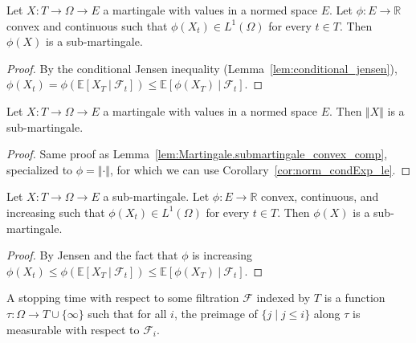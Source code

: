 \begin{lemma}\label{lem:Martingale.submartingale_convex_comp}
Let $X : T \rightarrow \Omega\rightarrow E$ a martingale with values in a normed space $E$.
Let $\phi : E \rightarrow \mathbb{R}$ convex and continuous such that
$\phi(X_t)\in L^1(\Omega)$ for every $t\in T$. Then $\phi(X)$ is a sub-martingale.
\end{lemma}

\begin{proof}
  By the conditional Jensen inequality (Lemma~\ref{lem:conditional_jensen}),
  $\phi(X_t) = \phi\left( \mathbb{E}[X_T\ |\ \mathcal{F}_t] \right)\leq \mathbb{E}[\phi(X_T)\ |\ \mathcal{F}_t]$.
\end{proof}


\begin{corollary}\label{cor:Martingale.submartingale_norm}
  Let $X : T \rightarrow \Omega \rightarrow E$ a martingale with values in a normed space $E$.
  Then $\Vert X \Vert$ is a sub-martingale.
\end{corollary}

\begin{proof}
Same proof as Lemma~\ref{lem:Martingale.submartingale_convex_comp}, specialized to $\phi = \Vert \cdot \Vert$, for which we can use Corollary~\ref{cor:norm_condExp_le}.
\end{proof}


\begin{lemma}\label{lem:convex_of_submg_is_submg}
Let $X : T  \rightarrow \Omega \rightarrow E$ a sub-martingale.
Let $\phi:E \rightarrow \mathbb{R}$ convex, continuous, and increasing such that
$\phi(X_t)\in L^1(\Omega)$ for every $t\in T$. Then $\phi(X)$ is a sub-martingale.
\end{lemma}

\begin{proof}
  By Jensen and the fact that $\phi$ is increasing
  $\phi(X_t) \leq \phi\left( \mathbb{E}[X_T\ |\ \mathcal{F}_t] \right)\leq \mathbb{E}[\phi(X_T)\ |\ \mathcal{F}_t]$.
\end{proof}


\begin{definition}\label{def:IsStoppingTime}
  \mathlibok
A stopping time with respect to some filtration $\mathcal{F}$ indexed by $T$ is a function $\tau : \Omega \to T \cup \{\infty\}$ such that for all $i$, the preimage of $\{j \mid j \le i\}$ along $\tau$ is measurable with respect to $\mathcal{F}_i$.
\end{definition}


